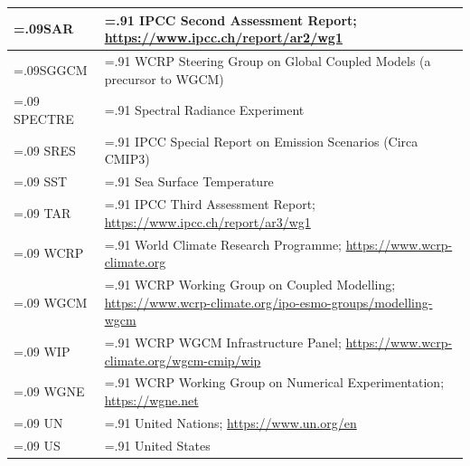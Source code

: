 \documentclass[gmd, preprint]{copernicus}
\begin{document}
\begin{table}[htp]
{\begin{tabularx}{1\textwidth} { 
	  | >{\raggedright\arraybackslash\hsize=.09\hsize}X
	  | >{\centering\arraybackslash\hsize=.91\hsize}X | }
\hline
SAR & IPCC Second Assessment Report; \url{https://www.ipcc.ch/report/ar2/wg1} \\
\hline
SGGCM & WCRP Steering Group on Global Coupled Models (a precursor to WGCM) \\
\hline
SPECTRE & Spectral Radiance Experiment \\
\hline
SRES & IPCC Special Report on Emission Scenarios (Circa CMIP3) \\
\hline
SST & Sea Surface Temperature \\
\hline
TAR & IPCC Third Assessment Report; \url{https://www.ipcc.ch/report/ar3/wg1} \\
\hline
WCRP & World Climate Research Programme; \url{https://www.wcrp-climate.org} \\
\hline
WGCM & WCRP Working Group on Coupled Modelling; \url{https://www.wcrp-climate.org/ipo-esmo-groups/modelling-wgcm} \\
\hline
WIP & WCRP WGCM Infrastructure Panel; \url{https://www.wcrp-climate.org/wgcm-cmip/wip} \\
\hline
WGNE & WCRP Working Group on Numerical Experimentation; \url{https://wgne.net} \\
\hline
UN & United Nations; \url{https://www.un.org/en} \\
\hline
US & United States \\
\hline
\end{tabularx}
} %
\label{tab:tabAppE1-Acronyms}
\end{table}


\noappendix       %




\appendixfigures  %
\end{document}
